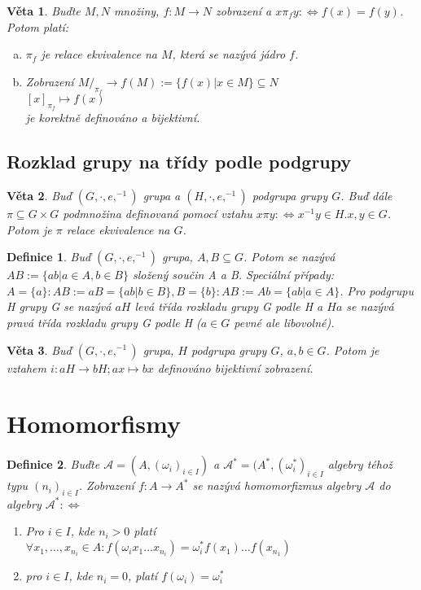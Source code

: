 \documentclass[a4paper, 11pt]{report}
\newtheorem{mydef}{Definice}[chapter]
\newtheorem{veta}{Věta}[chapter]
\begin{document}
\begin{veta}
Buďte $M, N$ množiny, $f: M \to N$ zobrazení a $x \pi_f y: \Leftrightarrow f(x) = f(y)$. Potom platí:
\begin{enumerate}[a)]
	\item $\pi_f$ je relace ekvivalence na $M$, která se nazývá jádro $f$.
	\item Zobrazení
	$M/_{\pi_f} \to f(M) := \{f(x) | x \in M\} \subseteq N$\\
	$[x]_{\pi_f} \mapsto f(x)$\\
	je korektně definováno a bijektivní.
\end{enumerate}
\end{veta}

\subsection{Rozklad grupy na třídy podle podgrupy}

\begin{veta}
Buď $(G, \cdot, e, ^{-1})$ grupa a $(H, \cdot, e, ^{-1})$ podgrupa grupy $G$. Buď dále $\pi \subseteq G \times G$ podmnožina definovaná pomocí vztahu $x \pi y: \Leftrightarrow x^{-1}y \in H. x, y \in G$. Potom je $\pi$ relace ekvivalence na $G$.
\end{veta}

\begin{mydef}
Buď $(G, \cdot, e, ^{-1})$ grupa, $A, B \subseteq G$. Potom se nazývá $AB := \{ab | a \in A, b \in B\}$ složený součin A a B. Speciální případy: $A = \{a\}: AB := aB = \{ab | b \in B\}, B = \{b\}: AB := Ab = \{ab | a \in A\}$. Pro podgrupu H grupy G se nazývá $aH$ levá třída rozkladu grupy G podle H a $Ha$ se nazývá pravá třída rozkladu grupy G podle H ($a \in G$ pevné ale libovolné).
\end{mydef}

\begin{veta}
Buď $(G, \cdot, e, ^{-1})$ grupa, $H$ podgrupa grupy $G$, $a, b \in G$. Potom je vztahem $i: aH \to bH; ax \mapsto bx$ definováno bijektivní zobrazení.
\end{veta}


\section{Homomorfismy}

\begin{mydef}
Buďte $\mathcal{A} = (A, (\omega_i)_{i \in I})$ a $\mathcal{A}^* = (A^*, (\omega^*_i)_{i \in I}$ algebry téhož typu $(n_i)_{i \in I}$. Zobrazení $f: A \to A^*$ se nazývá homomorfizmus algebry $\mathcal{A}$ do algebry $\mathcal{A}^*: \Leftrightarrow$
\begin{enumerate}
	\item Pro $i \in I$, kde $n_i > 0$ platí $\forall x_1, \dots, x_{n_i} \in A: f(\omega_ix_1 \dots x_{n_i}) = \omega_i^*f(x_1)\dots f(x_{n_1})$
	\item pro $i \in I$, kde $n_i = 0$, platí $f(\omega_i) = \omega_i^*$
\end{enumerate}
\end{mydef}
\end{document}
